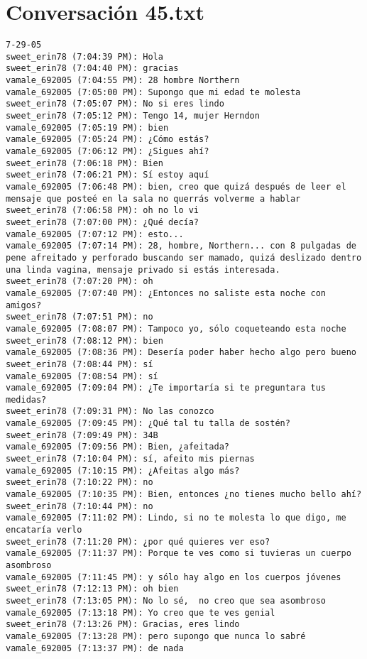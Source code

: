 \section{Conversaci\'on 45.txt}

\begin{verbatim}
7-29-05
sweet_erin78 (7:04:39 PM): Hola
sweet_erin78 (7:04:40 PM): gracias
vamale_692005 (7:04:55 PM): 28 hombre Northern 
vamale_692005 (7:05:00 PM): Supongo que mi edad te molesta
sweet_erin78 (7:05:07 PM): No si eres lindo
sweet_erin78 (7:05:12 PM): Tengo 14, mujer Herndon
vamale_692005 (7:05:19 PM): bien
vamale_692005 (7:05:24 PM): ¿Cómo estás?
vamale_692005 (7:06:12 PM): ¿Sigues ahí?
sweet_erin78 (7:06:18 PM): Bien
sweet_erin78 (7:06:21 PM): Sí estoy aquí
vamale_692005 (7:06:48 PM): bien, creo que quizá después de leer el mensaje que posteé en la sala no querrás volverme a hablar
sweet_erin78 (7:06:58 PM): oh no lo vi
sweet_erin78 (7:07:00 PM): ¿Qué decía?
vamale_692005 (7:07:12 PM): esto...
vamale_692005 (7:07:14 PM): 28, hombre, Northern... con 8 pulgadas de pene afreitado y perforado buscando ser mamado, quizá deslizado dentro una linda vagina, mensaje privado si estás interesada.
sweet_erin78 (7:07:20 PM): oh
vamale_692005 (7:07:40 PM): ¿Entonces no saliste esta noche con amigos?
sweet_erin78 (7:07:51 PM): no
vamale_692005 (7:08:07 PM): Tampoco yo, sólo coqueteando esta noche
sweet_erin78 (7:08:12 PM): bien
vamale_692005 (7:08:36 PM): Desería poder haber hecho algo pero bueno
sweet_erin78 (7:08:44 PM): sí
vamale_692005 (7:08:54 PM): sí
vamale_692005 (7:09:04 PM): ¿Te importaría si te preguntara tus medidas?
sweet_erin78 (7:09:31 PM): No las conozco
vamale_692005 (7:09:45 PM): ¿Qué tal tu talla de sostén?
sweet_erin78 (7:09:49 PM): 34B
vamale_692005 (7:09:56 PM): Bien, ¿afeitada?
sweet_erin78 (7:10:04 PM): sí, afeito mis piernas
vamale_692005 (7:10:15 PM): ¿Afeitas algo más?
sweet_erin78 (7:10:22 PM): no
vamale_692005 (7:10:35 PM): Bien, entonces ¿no tienes mucho bello ahí?
sweet_erin78 (7:10:44 PM): no
vamale_692005 (7:11:02 PM): Lindo, si no te molesta lo que digo, me encataría verlo
sweet_erin78 (7:11:20 PM): ¿por qué quieres ver eso?
vamale_692005 (7:11:37 PM): Porque te ves como si tuvieras un cuerpo asombroso
vamale_692005 (7:11:45 PM): y sólo hay algo en los cuerpos jóvenes
sweet_erin78 (7:12:13 PM): oh bien
sweet_erin78 (7:13:05 PM): No lo sé,  no creo que sea asombroso
vamale_692005 (7:13:18 PM): Yo creo que te ves genial
sweet_erin78 (7:13:26 PM): Gracias, eres lindo
vamale_692005 (7:13:28 PM): pero supongo que nunca lo sabré
vamale_692005 (7:13:37 PM): de nada

\end{verbatim}
